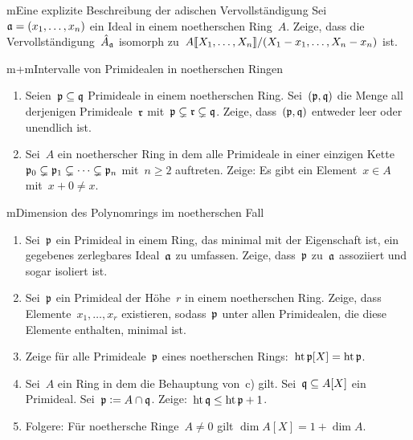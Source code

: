 \documentclass{uebblatt}
\begin{document}
\enlargethispage{2em}

\begin{aufgabe}{m}{Eine explizite Beschreibung der adischen Vervollständigung}
Sei~$\mathfrak{a} = (x_1,\ldots,x_n)$ ein Ideal in einem noetherschen Ring~$A$. Zeige,
dass die Vervollständigung~$\hat A_{\mathfrak{a}}$ isomorph
zu~${A}\llbracket{X_1,\ldots,X_n}\rrbracket/(X_1-x_1,\ldots,X_n-x_n)$ ist.
\end{aufgabe}

\begin{aufgabe}{m+m}{Intervalle von Primidealen in noetherschen Ringen}
\begin{enumerate}
\item
Seien~$\mathfrak{p} \subseteq \mathfrak{q}$ Primideale in einem
noetherschen Ring. Sei~$(\mathfrak{p},\mathfrak{q})$ die Menge all derjenigen Primideale~$\mathfrak{r}$
mit~$\mathfrak{p} \subsetneq \mathfrak{r} \subsetneq \mathfrak{q}$. Zeige, dass~$(\mathfrak{p},\mathfrak{q})$ entweder
leer oder unendlich ist.
\item Sei~$A$ ein noetherscher Ring in dem alle Primideale in einer einzigen Kette~$\mathfrak{p}_0
\subsetneq \mathfrak{p}_1 \subsetneq \cdots \subsetneq \mathfrak{p}_n$ mit~$n \geq 2$ auftreten.
Zeige: Es gibt ein Element~$x \in A$ mit~$x + 0 \neq x$.
\end{enumerate}
\end{aufgabe}

\begin{aufgabe}{m}{Dimension des Polynomrings im noetherschen Fall}
\begin{enumerate}
\item Sei~$\mathfrak{p}$ ein Primideal in einem Ring, das minimal mit der Eigenschaft
ist, ein gegebenes zerlegbares Ideal~$\mathfrak{a}$ zu umfassen. Zeige, dass~$\mathfrak{p}$
zu~$\mathfrak{a}$ assoziiert und sogar isoliert ist.
\item Sei~$\mathfrak{p}$ ein Primideal der Höhe~$r$ in einem noetherschen Ring.
Zeige, dass Elemente~$x_1,\ldots,x_r$ existieren, sodass~$\mathfrak{p}$ unter allen
Primidealen, die diese Elemente enthalten, minimal ist.
\item Zeige für alle Primideale~$\mathfrak{p}$ eines noetherschen Rings:~$\operatorname{ht}
\mathfrak{p}[X] = \operatorname{ht} \mathfrak{p}$.
\item Sei~$A$ ein Ring in dem die Behauptung von~c) gilt.
Sei~$\mathfrak{q} \subseteq A[X]$ ein Primideal. Sei~$\mathfrak{p} \vcentcolon= A \cap \mathfrak{q}$.
Zeige:~$\operatorname{ht} \mathfrak{q} \leq \operatorname{ht} \mathfrak{p} + 1$.
\item Folgere: Für noethersche Ringe~$A \neq 0$ gilt $\dim A[X] = 1 + \dim A$.
\end{enumerate}
\end{aufgabe}
\end{document}
